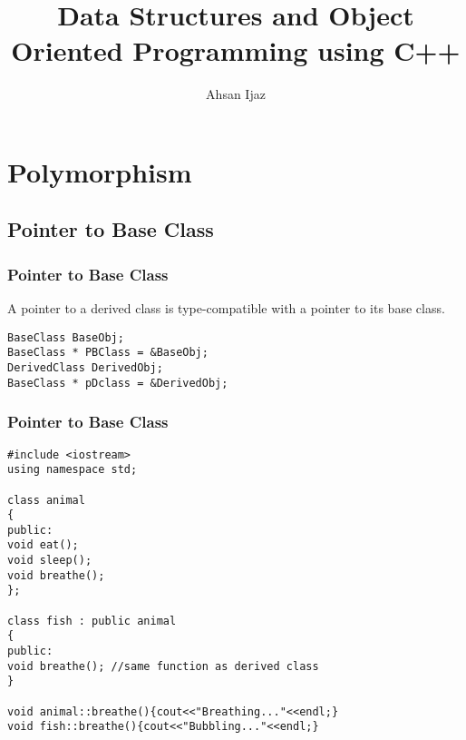 \documentclass{beamer}
\newtheorem{Key points}{Key points}
\newcommand\Fontviaa{\fontsize{8}{7.2}\selectfont}
\begin{document}
\title[Lecture 8]{Data Structures and Object Oriented Programming using C++} 
\author[]{Ahsan Ijaz}
\date{}
 \frame{\titlepage}

\section{Polymorphism}
\subsection{Pointer to Base Class}
\begin{frame}[fragile]
\frametitle{Pointer to Base Class}
  \begin{definition}
A pointer to a derived class is type-compatible with a pointer to its base class.
  \end{definition}
\begin{lstlisting}
BaseClass BaseObj;
BaseClass * PBClass = &BaseObj;
DerivedClass DerivedObj;
BaseClass * pDclass = &DerivedObj;
\end{lstlisting}
\end{frame}

\begin{frame}[fragile]
\frametitle{Pointer to Base Class}
\Fontviaa
\begin{lstlisting}
#include <iostream>
using namespace std;

class animal
{
public:
void eat();
void sleep();
void breathe();   
};

class fish : public animal
{
public:
void breathe(); //same function as derived class
}

void animal::breathe(){cout<<"Breathing..."<<endl;}
void fish::breathe(){cout<<"Bubbling..."<<endl;}
\end{lstlisting}
\end{frame}
\end{document}
